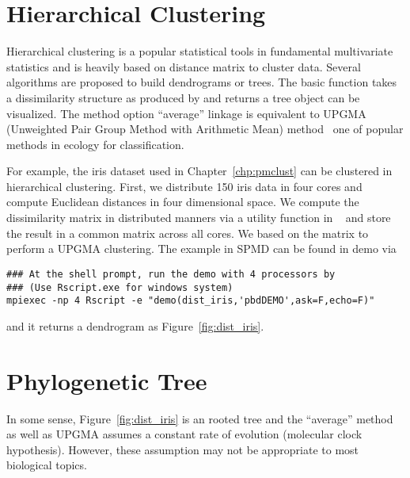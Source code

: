 \section{Hierarchical Clustering}

Hierarchical clustering is a popular statistical tools in fundamental
multivariate statistics and is heavily based on distance matrix to cluster
data. Several algorithms are proposed to build dendrograms or trees.
The basic function 
takes a dissimilarity structure as
produced by  and returns a tree object can be visualized.
The method option ``average'' linkage is equivalent to
UPGMA (Unweighted Pair Group Method with Arithmetic Mean)
method~\citep{Sokal1985} one of popular methods in ecology for classification.

For example, the iris dataset used in Chapter~\ref{chp:pmclust} can be
clustered in hierarchical clustering. First, we distribute 150 iris data
in four cores and compute Euclidean distances in four dimensional space.
We compute the dissimilarity matrix in distributed manners via a
utility function 
in ~\citep{Chen2012pbdMPIpackage}
and store the result in a common matrix across all cores. We based on
the matrix to perform a UPGMA clustering. The example in SPMD can be
found in demo via
\begin{lstlisting}
### At the shell prompt, run the demo with 4 processors by
### (Use Rscript.exe for windows system)
mpiexec -np 4 Rscript -e "demo(dist_iris,'pbdDEMO',ask=F,echo=F)"
\end{lstlisting}
and it returns a dendrogram as Figure~\ref{fig:dist_iris}.



\section{Phylogenetic Tree}

In some sense, Figure~\ref{fig:dist_iris} is an rooted tree and the
``average'' method as well as UPGMA assumes a constant rate of evolution
(molecular clock hypothesis). However, these assumption may not be
appropriate to most biological topics.



